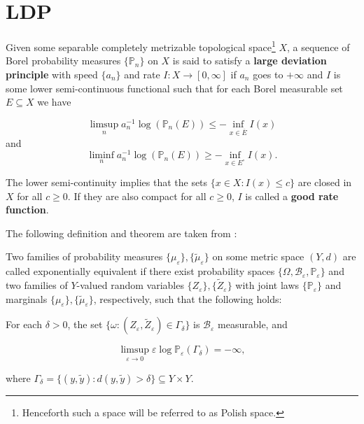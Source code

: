 \section{LDP}
\begin{definition}\label{def:LDP}
	Given some separable completely metrizable topological space\footnote{Henceforth such a space will be referred to as Polish space.} $X$, a sequence of Borel probability measures $\{\mathbb P_n\}$ on $X$ is said to satisfy a \textbf{large deviation principle} with speed $\{a_n\}$ and rate $I:X\rightarrow [0,\infty]$ if $a_n$ goes to $+\infty$ and $I$ is some lower semi-continuous functional such that for each Borel measurable set $E\subseteq X$ we have
	
	$$\limsup_n a_n^{-1}\log(\mathbb P_n(E))\leq -\inf_{x\in \overline E}I(x)$$
	and
	$$\liminf_n a_n^{-1}\log(\mathbb P_n(E))\geq -\inf_{x\in E^\circ}I(x).$$
	
	The lower semi-continuity implies that the sets $\{x\in X: I(x)\leq c\}$ are closed in $X$ for all $c\geq 0$. If they are also compact for all $c\geq 0$, $I$ is called a \textbf{good rate function}.
\end{definition}

The following definition and theorem are taken from \cite{Dembo2009LargeDeviations}:

\begin{definition}
	Two families of probability measures $\{\mu_\varepsilon\}, \{\tilde \mu_\varepsilon\}$ on some metric space $(Y,d)$ are called exponentially equivalent if there exist probability spaces $\{\Omega, \mathcal B_\varepsilon,\mathbb P_\varepsilon\}$ and two families of $Y$-valued random variables $\{Z_\varepsilon\}, \{\tilde Z_\varepsilon\}$ with joint laws $\{\mathbb P_\varepsilon\}$ and marginals $\{\mu_\varepsilon\}, \{\tilde \mu_\varepsilon\}$, respectively, such that the following holds:
	
	For each $\delta>0$, the set $\{\omega : (Z_\varepsilon, \tilde Z_\varepsilon)\in\Gamma_\delta\}$ is $\mathcal B_\varepsilon$ measurable, and 
	
	$$\limsup_{\varepsilon\rightarrow 0}\varepsilon\log\mathbb P_\varepsilon(\Gamma_\delta)=-\infty,$$
	
	where $\Gamma_\delta = \{(y,\tilde y):d(y,\tilde y)>\delta\}\subseteq Y\times Y$.
\end{definition}

